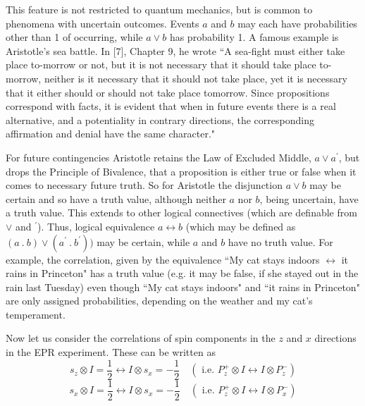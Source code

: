 \documentclass[12pt]{article}
\begin{document}
This feature is not restricted to quantum mechanics, but is common to phenomena with uncertain outcomes. Events $a$ and $b$ may each have probabilities other than 1 of occurring, while $a \vee b$ has probability 1. A famous example is Aristotle's sea battle. In [7], Chapter 9, he wrote  
``A sea-fight must either take place to-morrow or not, but it is not necessary that it should take place to-morrow, neither is it necessary that it should not take place, yet it is necessary that it either should or should not take place tomorrow. Since propositions correspond with facts, it is evident that when in future events there is a real alternative, and a potentiality in contrary directions, the corresponding affirmation and denial have the same character."

For future contingencies Aristotle retains the Law of Excluded Middle, $a \vee a^\prime$, but drops the Principle of Bivalence, that a proposition is either true or false when it comes to necessary future truth. So for Aristotle the disjunction  $a\vee b$ may be certain and so have a truth value, although neither $a$ nor $b$, being uncertain, have a truth value. This extends to other logical connectives (which are definable from $\vee$ and $^\prime$). Thus, logical equivalence $a\leftrightarrow b$ (which may be defined as $(a\ .\ b) \vee (a^\prime \ . \ b^\prime))$ may be certain, while $a$ and $b$ have no truth value. For example, the correlation, given by the equivalence ``My cat stays indoors $\leftrightarrow$ it rains in Princeton" has a truth value (e.g. it may be false, if she stayed out in the rain last Tuesday) even though ``My cat stays indoors" and ``it rains in Princeton" are only assigned probabilities, depending on the weather and my cat's temperament.

Now let us consider the correlations of spin components in the $z$ and $x$ directions in the EPR experiment. These can be written as 
\begin{equation}
s_z\otimes I = \frac{1}{2} \leftrightarrow I\otimes s_x = -\frac{1}{2} \hspace{1em} (\mbox{ i.e. } P_z^+\otimes I \leftrightarrow I\otimes P_z^-)
\end{equation}
\begin{equation}
s_x\otimes I = \frac{1}{2} \leftrightarrow I\otimes s_x = -\frac{1}{2} \hspace{1em}(\mbox{ i.e. } P_z^+ \otimes I \leftrightarrow I \otimes P_x^-)
\end{equation}
                                                             
\end{document}
